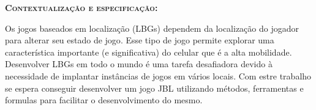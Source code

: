 \documentclass[12pt,a4paper]{article}
\author{Ítalo César Alves de Oliveira}
\begin{document}
\begin{flushleft}
\textbf{\textsc{Contextualização e especificação:}}
\end{flushleft}

	Os jogos baseados em localização (LBGs) dependem da localização do jogador para alterar seu estado de jogo\cite{Maia}. Esse tipo de jogo permite explorar uma característica importante (e significativa) do celular que é a alta mobilidade\cite{Luis}. Desenvolver LBGs em todo o mundo é uma tarefa desafiadora devido à necessidade de implantar instâncias de jogos em vários locais\cite{Maia}. Com estre trabalho se espera conseguir desenvolver um jogo JBL utilizando métodos, ferramentas e formulas para facilitar o desenvolvimento do mesmo.

	



\end{document}
